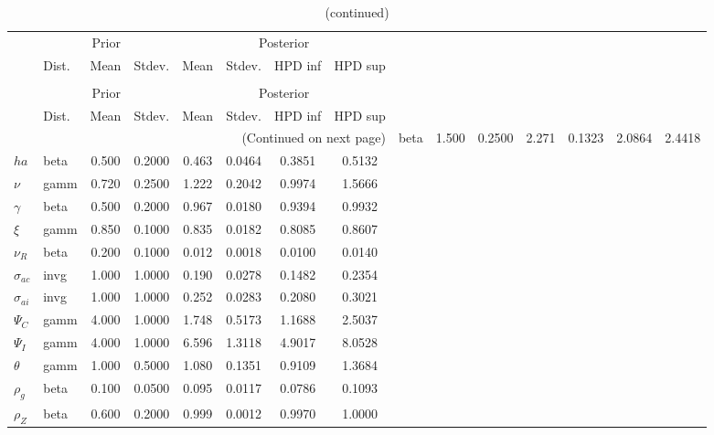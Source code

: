  
\begin{center}
\begin{longtable}{llcccccc} 
\caption{Results from Metropolis-Hastings (parameters)}
 \label{Table:MHPosterior:1}\\
\toprule 
  & \multicolumn{3}{c}{Prior}  &  \multicolumn{4}{c}{Posterior} \\
  \cmidrule(r{.75em}){2-4} \cmidrule(r{.75em}){5-8}
  & Dist. & Mean  & Stdev. & Mean & Stdev. & HPD inf & HPD sup\\
\midrule \endfirsthead 
\caption{(continued)}\\\toprule 
  & \multicolumn{3}{c}{Prior}  &  \multicolumn{4}{c}{Posterior} \\
  \cmidrule(r{.75em}){2-4} \cmidrule(r{.75em}){5-8}
  & Dist. & Mean  & Stdev. & Mean & Stdev. & HPD inf & HPD sup\\
\midrule \endhead 
\bottomrule \multicolumn{8}{r}{(Continued on next page)} \endfoot 
\bottomrule \endlastfoot 
${\sigma}$ & beta &   1.500 & 0.2500 &   2.271& 0.1323 &  2.0864 &  2.4418 \\ 
${ha}$ & beta &   0.500 & 0.2000 &   0.463& 0.0464 &  0.3851 &  0.5132 \\ 
$\nu$ & gamm &   0.720 & 0.2500 &   1.222& 0.2042 &  0.9974 &  1.5666 \\ 
$\gamma$ & beta &   0.500 & 0.2000 &   0.967& 0.0180 &  0.9394 &  0.9932 \\ 
$\xi$ & gamm &   0.850 & 0.1000 &   0.835& 0.0182 &  0.8085 &  0.8607 \\ 
${\nu_R}$ & beta &   0.200 & 0.1000 &   0.012& 0.0018 &  0.0100 &  0.0140 \\ 
${\sigma_{ac}}$ & invg &   1.000 & 1.0000 &   0.190& 0.0278 &  0.1482 &  0.2354 \\ 
${\sigma_{ai}}$ & invg &   1.000 & 1.0000 &   0.252& 0.0283 &  0.2080 &  0.3021 \\ 
${\Psi_{C}}$ & gamm &   4.000 & 1.0000 &   1.748& 0.5173 &  1.1688 &  2.5037 \\ 
${\Psi_I}$ & gamm &   4.000 & 1.0000 &   6.596& 1.3118 &  4.9017 &  8.0528 \\ 
${\theta}$ & gamm &   1.000 & 0.5000 &   1.080& 0.1351 &  0.9109 &  1.3684 \\ 
${\rho_g}$ & beta &   0.100 & 0.0500 &   0.095& 0.0117 &  0.0786 &  0.1093 \\ 
${\rho_Z}$ & beta &   0.600 & 0.2000 &   0.999& 0.0012 &  0.9970 &  1.0000 \\ 

\end{longtable}
\end{center}
